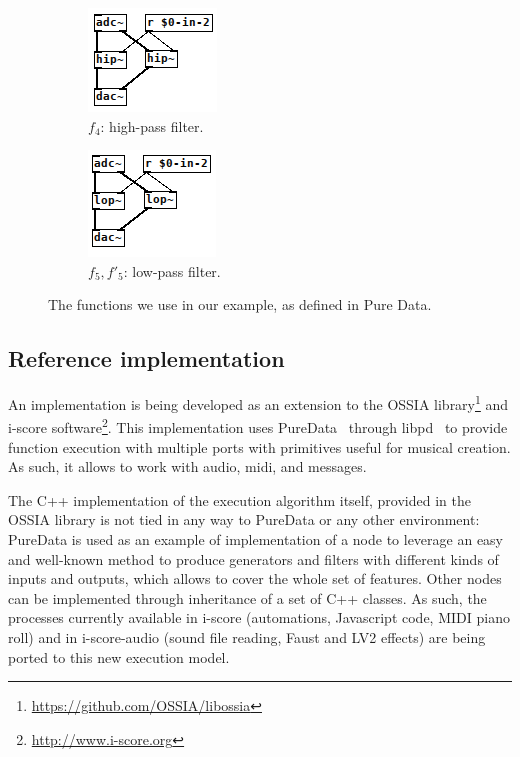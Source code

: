 \documentclass{article}
\begin{document}
\begin{figure}
    \begin{subfigure}{0.21\textwidth}\centering
        \includegraphics[scale=0.5]{images/pd-4.png}
        \caption{$f_4$: high-pass filter.}
    \end{subfigure}
    \begin{subfigure}{0.21\textwidth}\centering
        \includegraphics[scale=0.5]{images/pd-5.png}
        \caption{$f_5, f'_5$: low-pass filter.}
    \end{subfigure}
    \caption{The functions we use in our example, as defined in Pure Data.}
    \label{fig.pdpatches}
\end{figure}

\subsection{Reference implementation}
An implementation is being developed as an extension to the OSSIA library\footnote{\url{https://github.com/OSSIA/libossia}} and i-score software\footnote{\url{http://www.i-score.org}}. 
This implementation uses PureData~\cite{puckette1996pure} through libpd~\cite{brinkmann2011embedding} to provide function execution with multiple ports with primitives useful for musical creation. 
As such, it allows to work with audio, midi, and messages.

The C++ implementation of the execution algorithm itself, provided in the OSSIA library is not tied in any way to PureData or any other environment: PureData is used as an example of implementation of a node to leverage an easy and well-known method to produce generators and filters with different kinds of inputs and outputs, which allows to cover the whole set of features.
Other nodes can be implemented through inheritance of a set of C++ classes.
As such, the processes currently available in i-score (automations, Javascript code, MIDI piano roll) and in i-score-audio (sound file reading, Faust and LV2 effects) are being ported to this new execution model.
\end{document}
